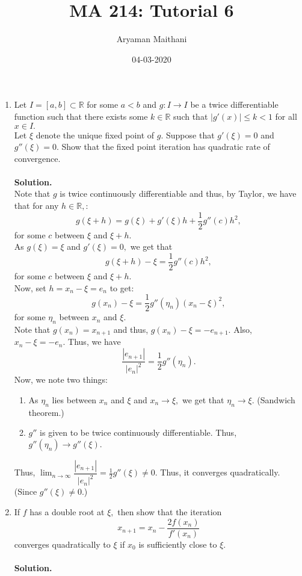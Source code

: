 \documentclass{article}
\title{MA 214: Tutorial 6}
\author{Aryaman Maithani}
\date{04-03-2020}
\begin{document}
\maketitle
\begin{enumerate} 
	\item Let $I = [a, b] \subset \mathbb{R}$ for some $a < b$ and $g:I\to I$ be a twice differentiable function such that there exists some $k \in \mathbb{R}$ such that $|g'(x)| \le k < 1$ for all $x \in I.$\\
	Let $\xi$ denote the unique fixed point of $g.$ Suppose that $g'(\xi) = 0$ and $g''(\xi) = 0.$ Show that the fixed point iteration has quadratic rate of convergence.\\~\\
	\textbf{Solution.}\\
	Note that $g$ is twice continuously differentiable and thus, by Taylor, we have that for any $h \in \mathbb{R},$:
	\[g(\xi + h) = g(\xi) + g'(\xi)h + \frac{1}{2}g''(c)h^2,\]
	for some $c$ between $\xi$ and $\xi + h.$\\
	As $g(\xi) = \xi$ and $g'(\xi) = 0,$ we get that
	\[g(\xi + h) - \xi = \frac{1}{2}g''(c)h^2,\]
	for some $c$ between $\xi$ and $\xi + h.$\\
	Now, set $h = x_{n} - \xi = e_{n}$ to get:
	\[g(x_{n}) - \xi = \frac{1}{2}g''(\eta_n)(x_n - \xi)^2,\]
	for some $\eta_n$ between $x_n$ and $\xi.$\\
	Note that $g(x_n) = x_{n+1}$ and thus, $g(x_n) - \xi = -e_{n+1}.$ Also, $x_n - \xi = -e_n.$ Thus, we have
	\[\frac{|e_{n+1}|}{|e_n|^2} = \frac{1}{2}g''(\eta_n).\]
	Now, we note two things:
	\begin{enumerate}[nosep] 
	 	\item As $\eta_n$ lies between $x_n$ and $\xi$ and $x_n \to \xi,$ we get that $\eta_n \to \xi.$ (Sandwich theorem.)
	 	\item $g''$ is given to be twice continuously differentiable. Thus, $g''(\eta_n) \to g''(\xi).$
	\end{enumerate} 
	Thus, $\displaystyle\lim_{n\to \infty}\dfrac{|e_{n+1}|}{|e_n|^2} = \frac{1}{2}g''(\xi) \neq 0.$ Thus, it converges quadratically. (Since $g''(\xi) \neq 0.$)
	\item If $f$ has a double root at $\xi,$ then show that the iteration
	\[x_{n+1} = x_n - \frac{2f(x_n)}{f'(x_n)}\]
	converges quadratically to $\xi$ if $x_0$ is sufficiently close to $\xi.$\\~\\
	\textbf{Solution.} \\

\end{enumerate}
\end{document}
